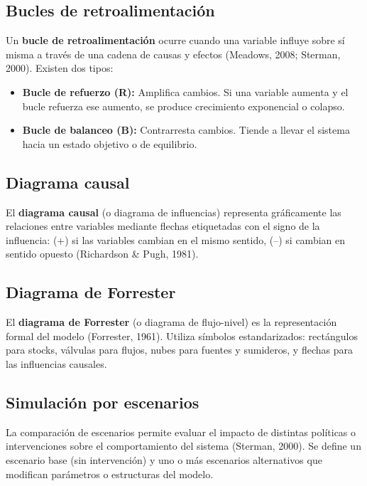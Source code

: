 \documentclass[10pt,a4paper]{article}
\begin{document}
\subsection{Bucles de retroalimentación}

Un \textbf{bucle de retroalimentación} ocurre cuando una variable influye sobre sí misma a través de una cadena de causas y efectos (Meadows, 2008; Sterman, 2000). Existen dos tipos:

\begin{itemize}
  \item \textbf{Bucle de refuerzo (R):} Amplifica cambios. Si una variable aumenta y el bucle refuerza ese aumento, se produce crecimiento exponencial o colapso.
  \item \textbf{Bucle de balanceo (B):} Contrarresta cambios. Tiende a llevar el sistema hacia un estado objetivo o de equilibrio.
\end{itemize}

\subsection{Diagrama causal}

El \textbf{diagrama causal} (o diagrama de influencias) representa gráficamente las relaciones entre variables mediante flechas etiquetadas con el signo de la influencia: (+) si las variables cambian en el mismo sentido, (--) si cambian en sentido opuesto (Richardson \& Pugh, 1981).

\subsection{Diagrama de Forrester}

El \textbf{diagrama de Forrester} (o diagrama de flujo-nivel) es la representación formal del modelo (Forrester, 1961). Utiliza símbolos estandarizados: rectángulos para stocks, válvulas para flujos, nubes para fuentes y sumideros, y flechas para las influencias causales.

\subsection{Simulación por escenarios}

La comparación de escenarios permite evaluar el impacto de distintas políticas o intervenciones sobre el comportamiento del sistema (Sterman, 2000). Se define un escenario base (sin intervención) y uno o más escenarios alternativos que modifican parámetros o estructuras del modelo.
\end{document}
